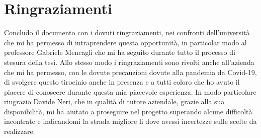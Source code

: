 \documentclass[a4paper,titlepage,12pt]{book}
\begin{document}
{\section{
Ringraziamenti}
Concludo il documento con i dovuti ringraziamenti, nei confronti dell'università che mi ha permesso di intraprendere questa opportunità, in particolar modo al professore Gabriele Mencagli che mi ha seguito durante tutto il processo di stesura della tesi. Allo stesso modo i ringraziamenti sono rivolti anche all'azienda che mi ha permesso, con le dovute precauzioni dovute alla pandemia da Covid-19, di svolgere questo tirocinio anche in presenza e a tutti coloro che ho avuto il piacere di conoscere durante questa mia piacevole esperienza. In modo particolare ringrazio Davide Neri, che in qualità di tutore aziendale, grazie alla sua disponibilità, mi ha aiutato a proseguire nel progetto superando alcune difficoltà incontrate e indicandomi la strada migliore li dove avessi incertezze sulle scelte da realizzare.


}
\end{document}
